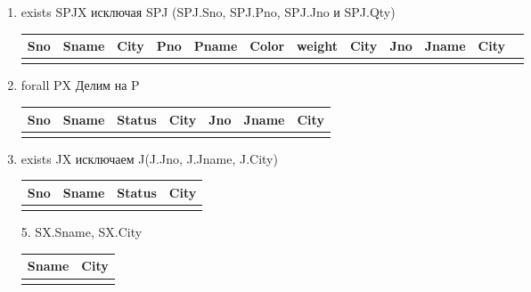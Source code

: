\documentclass[a4paper, 14pt]{report}
\begin{document}
\begin{enumerate}
    \item exists SPJX исключая SPJ (SPJ.Sno, SPJ.Pno, SPJ.Jno и SPJ.Qty)

        \begin{tabular}{|c|c|c|c|c|c|c|c|c|c|c|c|}
            \hline
            Sno & Sname & City & Pno & Pname & Color & weight & City & Jno & Jname & City \\
            \hline
                & & & & & & & & & & \\
        \end{tabular}

    \item forall PX Делим на P

        \begin{tabular}{|c|c|c|c|c|c|c|}
            \hline
            Sno & Sname & Status & City & Jno & Jname & City \\
            \hline
                & & & & & & \\
        \end{tabular}

    \item exists JX исключаем J(J.Jno, J.Jname, J.City)

        \begin{tabular}{|c|c|c|c|}
            \hline
            Sno & Sname & Status & City \\
            \hline
                & & & \\
        \end{tabular}

    \item[5.] SX.Sname, SX.City

        \begin{tabular}{|c|c|}
            \hline
            Sname & City \\
            \hline
                  & \\
        \end{tabular}
\end{enumerate}
\end{document}
